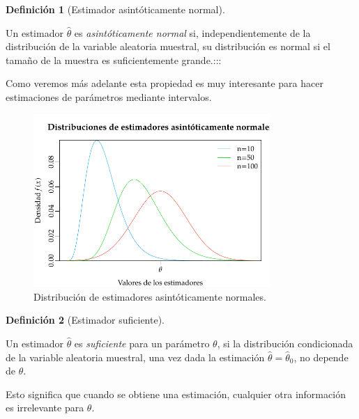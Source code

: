 \documentclass[
  a4paper,
]{scrreport}
\theoremstyle{plain}
\theoremstyle{definition}
\newtheorem{definition}{Definición}[chapter]
\theoremstyle{definition}
\theoremstyle{remark}
\begin{document}
\begin{definition}[Estimador asintóticamente
normal]\protect\hypertarget{def-estimador-asintóticamente-normal}{}\label{def-estimador-asintóticamente-normal}

Un estimador \(\hat \theta\) es \emph{asintóticamente normal} si,
independientemente de la distribución de la variable aleatoria muestral,
su distribución es normal si el tamaño de la muestra es suficientemente
grande.:::

\end{definition}

Como veremos más adelante esta propiedad es muy interesante para hacer
estimaciones de parámetros mediante intervalos.

\begin{figure}[H]

{\centering \includegraphics[width=0.8\textwidth,height=\textheight]{img/estimacion/estimador-asintoticamente-normal.pdf}

}

\caption{Distribución de estimadores asintóticamente normales.}

\end{figure}%

\begin{definition}[Estimador
suficiente]\protect\hypertarget{def-estimador-suficiente}{}\label{def-estimador-suficiente}

Un estimador \(\hat \theta\) es \emph{suficiente} para un parámetro
\(\theta\), si la distribución condicionada de la variable aleatoria
muestral, una vez dada la estimación \(\hat \theta = \hat \theta_0\), no
depende de \(\theta\).

\end{definition}

Esto significa que cuando se obtiene una estimación, cualquier otra
información es irrelevante para \(\theta\).
\end{document}
